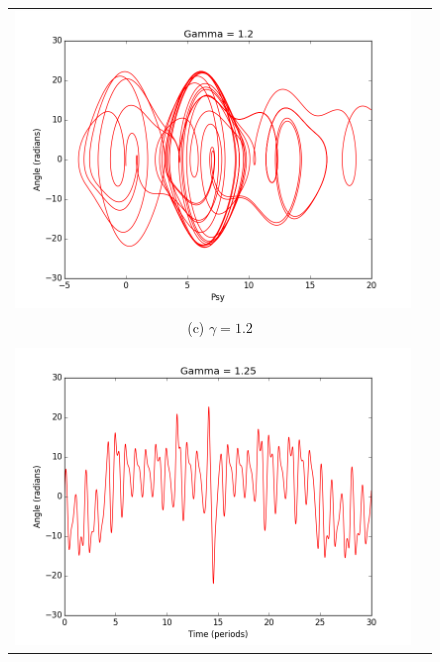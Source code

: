 \documentclass[11pt]{article}
\begin{document}
\begin{figure}[ht]
\begin{tabular}{cc}
\includegraphics[scale=.3]{g2psy.png}\\
\multicolumn{2}{c}{(c) $\gamma = 1.2 $} \\[6pt]\\

\includegraphics[scale=.3]{g25theta.png}&


\end{tabular}
\end{figure}
\end{document}
